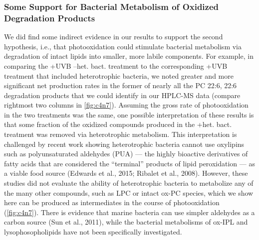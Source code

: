 \subsubsection{Some Support for Bacterial Metabolism of Oxidized Degradation Products}
\label{sssec:Some Support for Bacterial Metabolism of Oxidized Degradation Products}

We did find some indirect evidence in our results to support the second hypothesis, i.e., that photooxidation could stimulate bacterial metabolism via degradation of intact lipids into smaller, more labile components. For example, in comparing the +UVB --het. bact. treatment to the corresponding +UVB treatment that included heterotrophic bacteria, we noted greater and more significant net production rates in the former of nearly all the PC 22:6, 22:6 degradation products that we could identify in our HPLC-MS data (compare rightmost two columns in \autoref{fig:c4n7}). Assuming the gross rate of photooxidation in the two treatments was the same, one possible interpretation of these results is that some fraction of the oxidized compounds produced in the +het. bact. treatment was removed via heterotrophic metabolism. This interpretation is challenged by recent work showing heterotrophic bacteria cannot use oxylipins such as polyunsaturated aldehydes (PUA) --- the highly bioactive derivatives of fatty acids that are considered the ``terminal'' products of lipid peroxidation --- as a viable food source (Edwards et al., 2015; Ribalet et al., 2008). However, these studies did not evaluate the ability of heterotrophic bacteria to metabolize any of the many other compounds, such as LPC or intact ox-PC species, which we show here can be produced as intermediates in the course of photooxidation (\autoref{fig:c4n7}). There is evidence that marine bacteria can use simpler aldehydes as a carbon source (Sun et al., 2011), while the bacterial metabolisms of ox-IPL and lysophosopholipids have not been specifically investigated.

